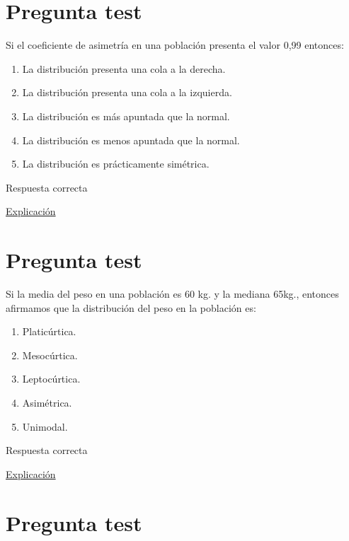 \documentclass[
]{book}
\providecommand{\tightlist}{%
  \setlength{\itemsep}{0pt}\setlength{\parskip}{0pt}}
\begin{document}
\hypertarget{pregunta-test-78}{%
\section{Pregunta test}\label{pregunta-test-78}}

Si el coeficiente de asimetría en una población presenta el valor 0,99 entonces:

\begin{enumerate}
\def\labelenumi{\alph{enumi})}
\tightlist
\item
  La distribución presenta una cola a la derecha.
\item
  La distribución presenta una cola a la izquierda.
\item
  La distribución es más apuntada que la normal.
\item
  La distribución es menos apuntada que la normal.
\item
  La distribución es prácticamente simétrica.
\end{enumerate}

Respuesta correcta

\href{https://1fjmanzano.github.io/bioestadistica/medidas-de-forma.html}{Explicación}

\hypertarget{pregunta-test-79}{%
\section{Pregunta test}\label{pregunta-test-79}}

Si la media del peso en una población es 60 kg. y la mediana 65kg., entonces afirmamos que la distribución del peso en la población es:

\begin{enumerate}
\def\labelenumi{\alph{enumi})}
\tightlist
\item
  Platicúrtica.
\item
  Mesocúrtica.
\item
  Leptocúrtica.
\item
  Asimétrica.
\item
  Unimodal.
\end{enumerate}

Respuesta correcta

\href{https://1fjmanzano.github.io/bioestadistica/medidas-de-forma.html}{Explicación}

\hypertarget{pregunta-test-80}{%
\section{Pregunta test}\label{pregunta-test-80}}
\end{document}
